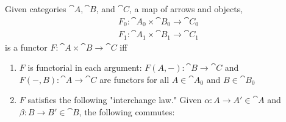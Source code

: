 \documentclass{article}
\begin{document}
\begin{lemma}
    Given categories $\cat A, \cat B$, and $\cat C$, a map of arrows and objects,
    \begin{align*}
        F_0 : \cat A_0 \times \cat B_0 \to \cat C_0 \\
        F_1 : \cat A_1 \times \cat B_1 \to \cat C_1
    \end{align*}
    is a functor $F:\cat A \times \cat B \to \cat C$ iff
    \begin{enumerate}
        \item $F$ is functorial in each argument: $F(A, -):\cat B \to \cat C$ and
              $F(-, B):\cat A \to \cat C$ are functors for all $A\in\cat A_0$ and $B\in \cat B_0$
        \item $F$ satisfies the following "interchange law." Given $\alpha: A\to A'\in \cat A$ and
              $\beta: B\to B'\in \cat B$, the following commutes:
              \begin{center}
              \end{center}
    \end{enumerate}
\end{lemma}
\end{document}

